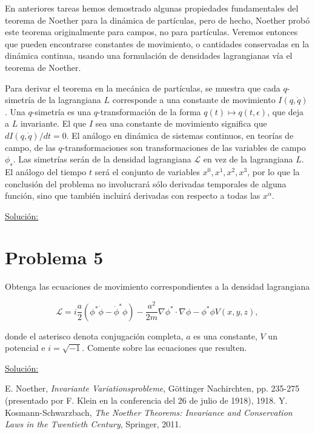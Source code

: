 \documentclass[a4paper,10pt]{article}
\numberwithin{equation}{section}
\begin{document}
\vspace{.3cm}

En anteriores tareas hemos demostrado algunas propiedades fundamentales del teorema de 
Noether para la dinámica de partículas, pero de hecho, Noether probó este teorema 
originalmente para campos, no para partículas. Veremos entonces que pueden encontrarse 
constantes de movimiento, o cantidades conservadas en la dinámica continua, usando 
una formulación de densidades lagrangianas vía el teorema de Noether.

\vspace{.3cm}

Para derivar el teorema en la mecánica de partículas, se muestra que cada $q$-simetría 
de la lagrangiana $L$ corresponde a una constante de movimiento $I(q,\dot{q})$. Una 
$q$-simetría es una $q$-transformación de la forma $q(t) \mapsto q(t,\epsilon)$, que 
deja a $L$ invariante. El que $I$ sea una constante de movimiento significa que 
$dI(q,\dot{q})/dt = 0$. El análogo en dinámica de sistemas continuos, en teorías 
de campo, de las $q$-transformaciones son transformaciones de las variables de 
campo $\phi_s$. Las simetrías serán de la densidad lagrangiana $\mathcal{L}$ en vez 
de la lagrangiana $L$. El análogo del tiempo $t$ será el conjunto de variables 
$x^0, x^1, x^2, x^3$, por lo que la conclusión del problema no involucrará sólo 
derivadas temporales de alguna función, sino que también incluirá derivadas con 
respecto a todas las $x^\alpha$. 

\vspace{.3cm}




\underline{Solución:} \vspace{.3cm}

\section{Problema 5}

Obtenga las ecuaciones de movimiento correspondientes a la densidad lagrangiana 

$$
\mathcal{L} = i\frac{a}{2} \left( \phi^*\dot{\phi} - \dot{\phi}^*\phi \right)  
- \frac{a^2}{2m}\nabla \phi^* \cdot \nabla \phi - \phi^*\phi V(x,y,z),
$$

donde el asterisco denota conjugación completa, $a$ es una constante, $V$ un 
potencial e $i=\sqrt{-1}$. Comente sobre las ecuaciones que resulten.

\vspace{.3cm}

\underline{Solución:} \vspace{.3cm}

\begin{thebibliography}{10}
E. Noether, \emph{Invariante Variationsprobleme}, Göttinger Nachirchten, pp. 235-275
(presentado por F. Klein en la conferencia del 26 de julio de 1918), 1918.
Y. Kosmann-Schwarzbach, \emph{The Noether Theorems: Invariance and Conservation Laws 
in the Twentieth Century}, Springer, 2011.


\end{thebibliography}
\end{document}
